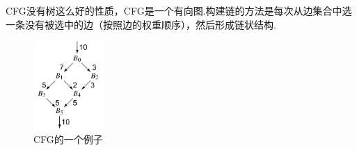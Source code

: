 
CFG没有树这么好的性质，CFG是一个有向图.构建链的方法是每次从边集合中选一条没有被选中的边（按照边的权重顺序），然后形成链状结构.

\begin{figure}[H]
    \centering
    \includegraphics[width=0.24\textwidth]{images/example_cfg.png}
    \caption{CFG的一个例子\cite{cooper2011engineering}}
\end{figure}

